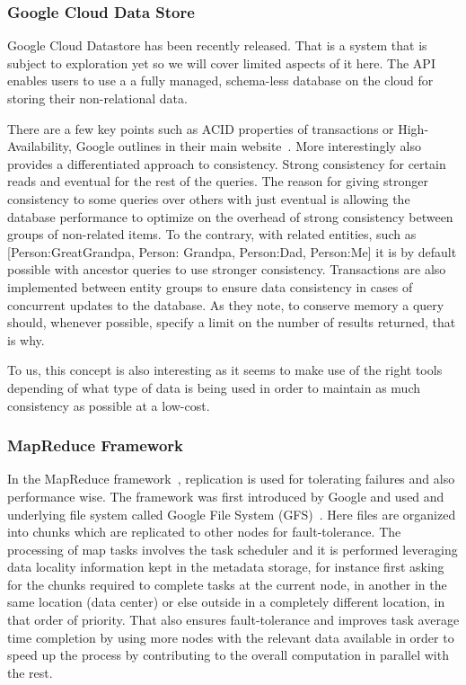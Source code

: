 \subsubsection{Google Cloud Data Store}
Google Cloud Datastore has been recently released. That is a system that is subject to exploration yet so we will cover limited aspects of it here. The API enables users to use a a fully managed, schema-less database on the cloud for storing their non-relational data.

There are a few key points such as ACID properties of transactions or High-Availability, Google outlines in their main website~\cite{GoogleCloudDataStore}. More interestingly also provides a differentiated approach to consistency. Strong consistency for certain reads and eventual for the rest of the queries. The reason for giving stronger consistency to some queries over others with just eventual is allowing the database performance to optimize on the overhead of strong consistency between groups of non-related items. To the contrary, with related entities, such as [Person:GreatGrandpa, Person: Grandpa, Person:Dad, Person:Me] it is by default possible with ancestor queries to use stronger consistency. Transactions are also implemented between entity groups to ensure data consistency in cases of concurrent updates to the database. As they note, to conserve memory a query should, whenever possible, specify a limit on the number of results returned, that is why.

To us, this concept is also interesting as it seems to make use of the right tools depending of what type of data is being used in order to maintain as much consistency as possible at a low-cost.

\subsubsection{MapReduce Framework}
In the MapReduce framework~\cite{Dean:04}, replication is used for tolerating failures and also performance wise. The framework was first introduced by Google and used and underlying file system called Google File System (GFS)~\cite{Ghemawat:03}. Here files are organized into chunks which are replicated to other nodes for fault-tolerance. The processing of map tasks involves the task scheduler and it is performed leveraging data locality information kept in the metadata storage, for instance first asking for the chunks required to complete tasks at the current node, in another in the same location (data center) or else outside in a completely different location, in that order of priority. That also ensures fault-tolerance and improves task average time completion by using more nodes with the relevant data available in order to speed up the process by contributing to the overall computation in parallel with the rest.


